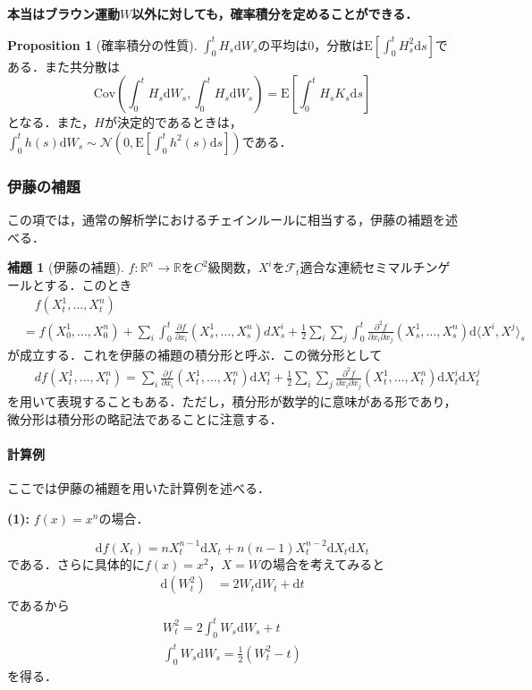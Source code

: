 \documentclass{jsarticle}
\theoremstyle{definition}
\newtheorem{prop}[dfn]{Proposition}
\newtheorem{lem}[dfn]{補題}
\begin{document}
\textbf{本当はブラウン運動$W$以外に対しても，確率積分を定めることができる．}

\begin{prop}[確率積分の性質]
    $\int_0^t H_s\mathrm{d}W_s$の平均は$0$，分散は$\mathrm{E}\left[\int_0^tH_s^2\mathrm{d}s\right]$である．また共分散は
    $$
        \mathrm{Cov}\left(\int_0^tH_s\mathrm{d}W_s, \int_0^tH_s\mathrm{d}W_s\right) = \mathrm{E}\left[\int_0^tH_sK_s\mathrm{d}s\right]
    $$
    となる．また，$H$が決定的であるときは，$\int_0^t h(s)\mathrm{d}W_s \sim \mathcal{N}\left(0, \mathrm{E}\left[\int_0^t h^2(s) \mathrm{d}s\right]\right)$である．
\end{prop}


\subsubsection{伊藤の補題}
この項では，通常の解析学におけるチェインルールに相当する，伊藤の補題を述べる．

\begin{lem}[伊藤の補題]
    $f: \mathbb{R}^n\rightarrow \mathbb{R}$を$C^2$級関数，$X^i$を$\mathscr{F}_t$適合な連続セミマルチンゲールとする．このとき
    \begin{align*}
        &\quad f(X_t^1, \ldots, X_t^n) \\
        &= f(X_0^1, \ldots, X_0^n) + \sum_i\int_0^t \frac{\partial f}{\partial x_i}(X_s^1, \ldots, X_s^n) dX_s^i + \frac{1}{2}\sum_i\sum_j \int_0^t \frac{\partial^2 f}{\partial x_i \partial x_j} (X_s^1, \ldots, X_s^n) \mathrm{d}\langle X^i,X^j\rangle _s
    \end{align*}
    が成立する．これを伊藤の補題の積分形と呼ぶ．この微分形として
    \begin{align*}
        &\quad df(X_t^1, \ldots, X_t^n) = \sum_i \frac{\partial f}{\partial x_i}(X_t^1, \ldots, X_t^n) \mathrm{d}X_t^i + \frac{1}{2}\sum_i\sum_j \frac{\partial^2 f}{\partial x_i \partial x_j} (X_t^1, \ldots, X_t^n) \mathrm{d}X_t^i \mathrm{d}X_t^j
    \end{align*}
    を用いて表現することもある．ただし，積分形が数学的に意味がある形であり，微分形は積分形の略記法であることに注意する．
\end{lem}

\paragraph{計算例} ここでは伊藤の補題を用いた計算例を述べる．\par
\noindent
\textbf{(1):} $f(x) = x^n$の場合．\par
$$
    \mathrm{d}f(X_t) = nX_t^{n-1}\mathrm{d}X_t + n(n-1)X_t^{n-2}\mathrm{d}X_t\mathrm{d}X_t
$$
である．さらに具体的に$f(x) = x^2$，$X=W$の場合を考えてみると
\begin{align*}
    \mathrm{d}(W_t^2) &= 2W_t\mathrm{d}W_t + \mathrm{d}t
\end{align*}
であるから
\begin{gather*}
    W_t^2 = 2\int_0^tW_s\mathrm{d}W_s + t\\
    \int_0^tW_s\mathrm{d}W_s = \frac{1}{2}\left(W_t^2 - t\right)
\end{gather*}
を得る．\par
\end{document}
